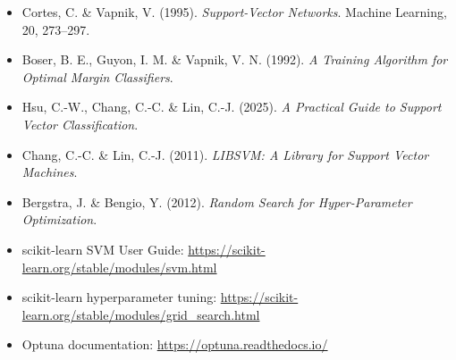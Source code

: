\documentclass{article}
\begin{document}
\begin{itemize}[leftmargin=*]
    \item Cortes, C. \& Vapnik, V. (1995). \textit{Support-Vector Networks}. Machine Learning, 20, 273--297.
    \item Boser, B. E., Guyon, I. M. \& Vapnik, V. N. (1992). \textit{A Training Algorithm for Optimal Margin Classifiers}.
    \item Hsu, C.-W., Chang, C.-C. \& Lin, C.-J. (2025). \textit{A Practical Guide to Support Vector Classification}.
    \item Chang, C.-C. \& Lin, C.-J. (2011). \textit{LIBSVM: A Library for Support Vector Machines}.
    \item Bergstra, J. \& Bengio, Y. (2012). \textit{Random Search for Hyper-Parameter Optimization}.
    \item scikit-learn SVM User Guide: \url{https://scikit-learn.org/stable/modules/svm.html}
    \item scikit-learn hyperparameter tuning: \url{https://scikit-learn.org/stable/modules/grid_search.html}
    \item Optuna documentation: \url{https://optuna.readthedocs.io/}
\end{itemize}
\end{document}
